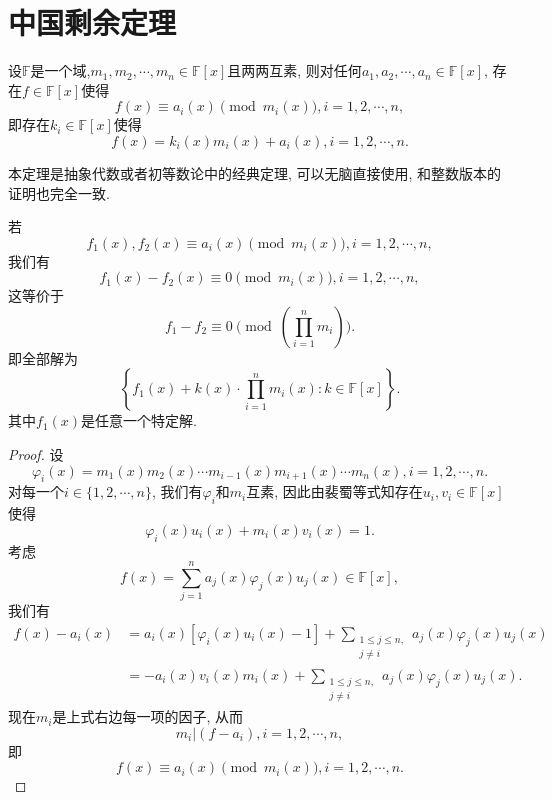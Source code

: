 \documentclass[../../main.tex]{subfiles}%
\begin{document}
\section{中国剩余定理}

\begin{theorem}[中国剩余定理]\label{theorem:中国剩余定理(多项式版)}
设$\mathbb{F}$是一个域,$m_1,m_2,\cdots,m_n\in\mathbb{F}[x]$且两两互素, 则对任何$a_1,a_2,\cdots,a_n\in\mathbb{F}[x]$, 存在$f\in\mathbb{F}[x]$使得
$$
f(x)\equiv a_i(x)\pmod{m_i(x)},i=1,2,\cdots,n,
$$
即存在$k_i\in\mathbb{F}[x]$使得
$$
f(x)=k_i(x)m_i(x)+a_i(x),i=1,2,\cdots,n.
$$
\end{theorem}
\begin{note}
本定理是抽象代数或者初等数论中的经典定理, 可以无脑直接使用, 和整数版本的证明也完全一致.
\end{note}
\begin{remark}
若
$$
f_1(x),f_2(x)\equiv a_i(x)\pmod{m_i(x)},i=1,2,\cdots,n,
$$
我们有
$$
f_1(x)-f_2(x)\equiv0\pmod{m_i(x)},i=1,2,\cdots,n,
$$
这等价于
$$
f_1-f_2\equiv0\pmod{\left(\prod_{i=1}^{n}m_i\right)}.
$$
即全部解为
$$
\left\{f_1(x)+k(x)\cdot\prod_{i=1}^{n}m_i(x):k\in\mathbb{F}[x]\right\}.
$$
其中$f_1(x)$是任意一个特定解.
\end{remark}
\begin{proof}
设
$$
\varphi_i(x)=m_1(x)m_2(x)\cdots m_{i-1}(x)m_{i+1}(x)\cdots m_n(x),i=1,2,\cdots,n.
$$
对每一个$i\in\{1,2,\cdots,n\}$, 我们有$\varphi_i$和$m_i$互素, 因此由裴蜀等式知存在$u_i,v_i\in\mathbb{F}[x]$使得
$$
\varphi_i(x)u_i(x)+m_i(x)v_i(x)=1.
$$
考虑
$$
f(x)=\sum_{j=1}^{n}a_j(x)\varphi_j(x)u_j(x)\in\mathbb{F}[x],
$$
我们有
$$
\begin{aligned}
f(x)-a_i(x)&=a_i(x)\left[\varphi_i(x)u_i(x)-1\right]+\sum_{\substack{1\leqslant j\leqslant n,\\j\neq i}}a_j(x)\varphi_j(x)u_j(x)\\
&=-a_i(x)v_i(x)m_i(x)+\sum_{\substack{1\leqslant j\leqslant n,\\j\neq i}}a_j(x)\varphi_j(x)u_j(x).
\end{aligned}
$$
现在$m_i$是上式右边每一项的因子, 从而
$$
m_i|(f-a_i),i=1,2,\cdots,n,
$$
即
$$
f(x)\equiv a_i(x)\pmod{m_i(x)},i=1,2,\cdots,n.
$$
\end{proof}
\end{document}
